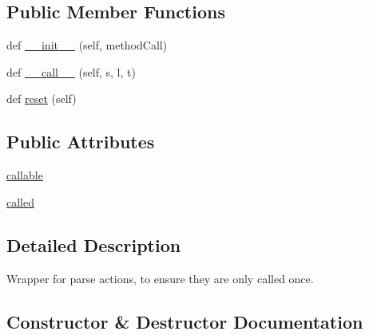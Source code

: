 \subsection*{Public Member Functions}
\begin{DoxyCompactItemize}
\item 
def \hyperlink{classsetuptools_1_1__vendor_1_1pyparsing_1_1OnlyOnce_a0c2ea369be2c0c26976d735de8edcfb7}{\+\_\+\+\_\+init\+\_\+\+\_\+} (self, method\+Call)
\item 
def \hyperlink{classsetuptools_1_1__vendor_1_1pyparsing_1_1OnlyOnce_ac252d23c28ac79dd583335b963831405}{\+\_\+\+\_\+call\+\_\+\+\_\+} (self, s, l, t)
\item 
def \hyperlink{classsetuptools_1_1__vendor_1_1pyparsing_1_1OnlyOnce_a5cf8d6511a3ea8030adf0bab3f45e54a}{reset} (self)
\end{DoxyCompactItemize}
\subsection*{Public Attributes}
\begin{DoxyCompactItemize}
\item 
\hyperlink{classsetuptools_1_1__vendor_1_1pyparsing_1_1OnlyOnce_ad0452c5518c13dabf5477187d8868e4b}{callable}
\item 
\hyperlink{classsetuptools_1_1__vendor_1_1pyparsing_1_1OnlyOnce_ab9543043067f60b710c208278b3f0d62}{called}
\end{DoxyCompactItemize}


\subsection{Detailed Description}
\begin{DoxyVerb}Wrapper for parse actions, to ensure they are only called once.
\end{DoxyVerb}
 

\subsection{Constructor \& Destructor Documentation}
\mbox{\label{classsetuptools_1_1__vendor_1_1pyparsing_1_1OnlyOnce_a0c2ea369be2c0c26976d735de8edcfb7}} 

